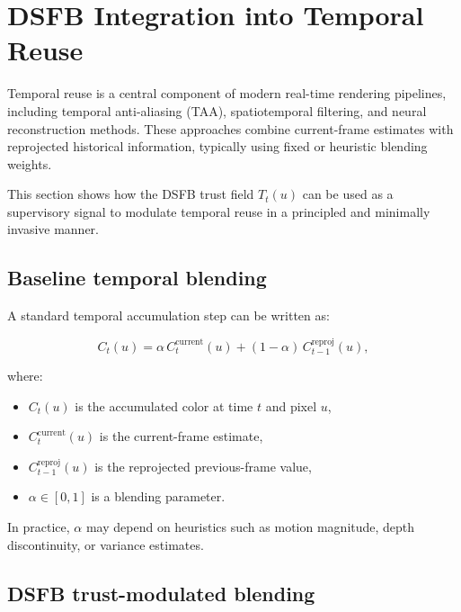 \documentclass[11pt]{article}
\theoremstyle{definition}
\theoremstyle{plain}
\begin{document}
\section{DSFB Integration into Temporal Reuse}
\label{sec:trg_integration}

Temporal reuse is a central component of modern real-time rendering pipelines, including temporal anti-aliasing (TAA), spatiotemporal filtering, and neural reconstruction methods. These approaches combine current-frame estimates with reprojected historical information, typically using fixed or heuristic blending weights.

This section shows how the DSFB trust field $T_t(u)$ can be used as a supervisory signal to modulate temporal reuse in a principled and minimally invasive manner.


\subsection{Baseline temporal blending}

A standard temporal accumulation step can be written as:

\begin{equation}
C_t(u) = \alpha \, C_t^{\mathrm{current}}(u) 
+ (1 - \alpha) \, C_{t-1}^{\mathrm{reproj}}(u),
\end{equation}

where:
\begin{itemize}[leftmargin=1.5em]
    \item $C_t(u)$ is the accumulated color at time $t$ and pixel $u$,
    \item $C_t^{\mathrm{current}}(u)$ is the current-frame estimate,
    \item $C_{t-1}^{\mathrm{reproj}}(u)$ is the reprojected previous-frame value,
    \item $\alpha \in [0,1]$ is a blending parameter.
\end{itemize}

In practice, $\alpha$ may depend on heuristics such as motion magnitude, depth discontinuity, or variance estimates.


\subsection{DSFB trust-modulated blending}
\end{document}
